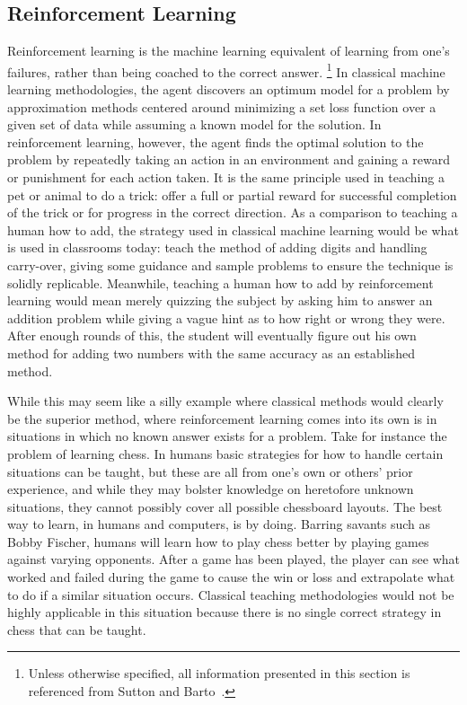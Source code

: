 \subsection{Reinforcement Learning}
\label{sec:intro-reinf}



Reinforcement learning is the machine learning equivalent of learning from one's
failures,
rather than being coached to the correct answer.%
\footnote{
	Unless otherwise specified,
	all information presented in this section is referenced from
	Sutton and Barto~\cite{rl_book}.
}
%
In classical machine learning methodologies,
the agent discovers an optimum model for a problem by approximation methods
centered around minimizing a set loss function over a given set of data
while assuming a known model for the solution.
%
In reinforcement learning,
however,
the agent finds the optimal solution to the problem by repeatedly taking an
action in an environment and gaining a reward or punishment for each
action taken.
%
It is the same principle used in teaching a pet or animal to do a trick:
offer a full or partial reward for successful completion of the trick or
for progress in the correct direction.
%
As a comparison to teaching a human how to add,
the strategy used in classical machine learning would be what is used in
classrooms today:
teach the method of adding digits and handling carry-over,
giving some guidance and sample problems to ensure the technique is solidly
replicable.
%
Meanwhile, teaching a human how to add by reinforcement learning would
mean merely quizzing the subject by asking him to answer an addition problem
while giving a vague hint as to how right or wrong they were.
%
After enough rounds of this,
the student will eventually figure out his own method for adding two numbers
with the same accuracy as an established method.

While this may seem like a silly example where classical methods would clearly
be the superior method,
where reinforcement learning comes into its own is in situations in which no
known answer exists for a problem.
%
Take for instance the problem of learning chess.
%
In humans
basic strategies for how to handle certain situations can be taught,
but these are all from one's own or others' prior experience,
and while they may bolster knowledge on heretofore unknown situations,
they cannot possibly cover all possible chessboard layouts.
%
The best way to learn, in humans and computers, is by doing.
%
Barring savants such as Bobby Fischer,
humans will learn how to play chess better by playing games against varying
opponents.
%
After a game has been played,
the player can see what worked and failed during the game to cause the win or
loss and extrapolate what to do if a similar situation occurs.
%
Classical teaching methodologies would not be highly applicable in this
situation because there is no single correct strategy in chess that can
be taught.





